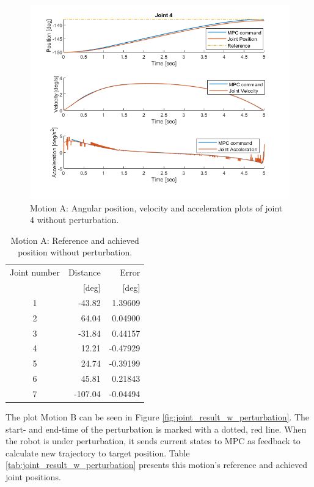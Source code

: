 \documentclass[final]{LTHtwocol} %
\begin{document}
\begin{figure}
    \centering
    \includegraphics[width=\linewidth]{result_without_perturbation_Joint4.png}
    \caption{Motion A: Angular position, velocity and acceleration plots of joint 4 without perturbation.}
    \label{fig:joint_result_wo_perturbation}
\end{figure}

\begin{table}[t]
	\centering
	\caption{Motion A: Reference and achieved position without perturbation.}
	\label{tab:joint_result_wo_perturbation}
	\begin{tabular}{crr} %
		\toprule
		Joint number & Distance & Error \\ 
		 &  [deg] & [deg] \\ 
        \midrule
		1 & -43.82   & 1.39609    \\ 
		2 & 64.04    & 0.04900   \\ 
		3 & -31.84   & 0.44157    \\ 
		4 & 12.21    & -0.47929  \\ 
		5 & 24.74    & -0.39199  \\
		6 & 45.81    & 0.21843   \\ 
		7 & -107.04  & -0.04494   \\ 
        \bottomrule 
	\end{tabular}
\end{table}

The plot Motion B can be seen in Figure \ref{fig:joint_result_w_perturbation}. The start- and end-time of the perturbation is marked with a dotted, red line. When the robot is under perturbation, it sends current states to MPC as feedback to calculate new trajectory to target position. Table \ref{tab:joint_result_w_perturbation} presents this motion's reference and achieved joint positions. 
\end{document}
